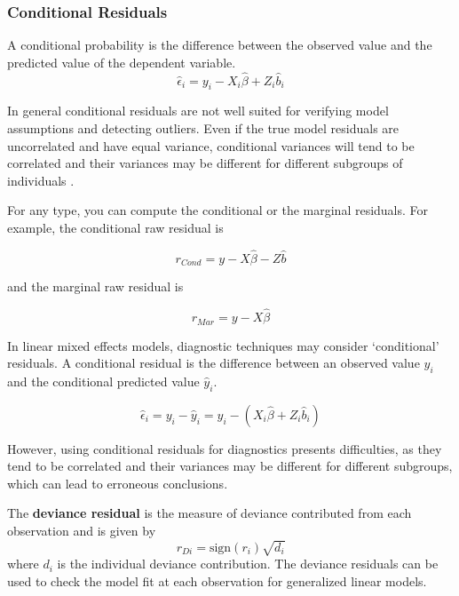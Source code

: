 \documentclass[12pt, a4paper]{report}
\theoremstyle{plain}
\theoremstyle{definition}
\theoremstyle{remark}
\begin{document}
	
	\subsubsection{Conditional Residuals}
	A conditional probability is the difference between the observed value and the predicted value of the dependent variable.
	\begin{equation*}
	\hat{\epsilon}_{i} = y_{i} - X_{i}\hat{\beta} + Z_{i}\hat{b}_{i}
	\end{equation*}
	
	In general conditional residuals are not well suited for verifying model assumptions and detecting outliers. Even if the true model residuals are uncorrelated and have equal variance, conditional variances will tend to be correlated and their variances may be different for different subgroups of individuals \citep{west}.
	
	
	
	
	For any type, you can compute the conditional or the marginal residuals. For example, the conditional raw residual is
	
	
	\[ r_{Cond} = y - X \hat{\beta} - Z \hat{b} \]
	
	and the marginal raw residual is
	
	
	
	\[ r_{Mar} = y - X \hat{\beta} \]
	
In linear mixed effects models, diagnostic techniques may consider `conditional' residuals. A conditional residual is the difference between an observed value $y_{i}$ and the conditional predicted value $\hat{y}_{i} $.
	
	\[ \hat{\epsilon}_{i} = y_{i} - \hat{y}_{i} = y_{i} - ( X_{i}\hat{\beta} + Z_{i}\hat{b}_{i}) \]
	
However, using conditional residuals for diagnostics presents difficulties, as they tend to be correlated and their variances may be different for different subgroups, which can lead to erroneous conclusions.
	
	
	
The \textbf{deviance residual} is the measure of deviance contributed from each observation and is given by
	\[r_{Di} = \textrm{sign}( r_{i})
	\sqrt{ d_{i}}\]
where $d_i$ is the individual deviance contribution. The deviance residuals can be used to check the model fit at each observation for generalized linear models. 
	
\end{document}
